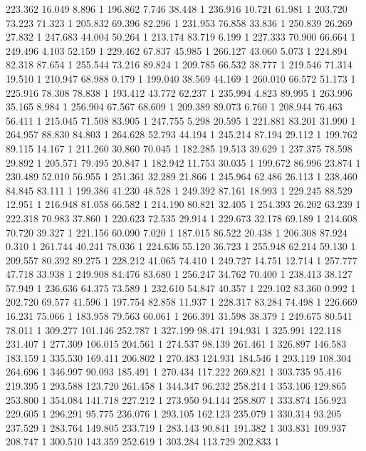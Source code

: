	223.362	16.049	8.896	1
	196.862	7.746	38.448	1
	236.916	10.721	61.981	1
	203.720	73.223	71.323	1
	205.832	69.396	82.296	1
	231.953	76.858	33.836	1
	250.839	26.269	27.832	1
	247.683	44.004	50.264	1
	213.174	83.719	6.199	1
	227.333	70.900	66.664	1
	249.496	4.103	52.159	1
	229.462	67.837	45.985	1
	266.127	43.060	5.073	1
	224.894	82.318	87.654	1
	255.544	73.216	89.824	1
	209.785	66.532	38.777	1
	219.546	71.314	19.510	1
	210.947	68.988	0.179	1
	199.040	38.569	44.169	1
	260.010	66.572	51.173	1
	225.916	78.308	78.838	1
	193.412	43.772	62.237	1
	235.994	4.823	89.995	1
	263.996	35.165	8.984	1
	256.904	67.567	68.609	1
	209.389	89.073	6.760	1
	208.944	76.463	56.411	1
	215.045	71.508	83.905	1
	247.755	5.298	20.595	1
	221.881	83.201	31.990	1
	264.957	88.830	84.803	1
	264.628	52.793	44.194	1
	245.214	87.194	29.112	1
	199.762	89.115	14.167	1
	211.260	30.860	70.045	1
	182.285	19.513	39.629	1
	237.375	78.598	29.892	1
	205.571	79.495	20.847	1
	182.942	11.753	30.035	1
	199.672	86.996	23.874	1
	230.489	52.010	56.955	1
	251.361	32.289	21.866	1
	245.964	62.486	26.113	1
	238.460	84.845	83.111	1
	199.386	41.230	48.528	1
	249.392	87.161	18.993	1
	229.245	88.529	12.951	1
	216.948	81.058	66.582	1
	214.190	80.821	32.405	1
	254.393	26.202	63.239	1
	222.318	70.983	37.860	1
	220.623	72.535	29.914	1
	229.673	32.178	69.189	1
	214.608	70.720	39.327	1
	221.156	60.090	7.020	1
	187.015	86.522	20.438	1
	206.308	87.924	0.310	1
	261.744	40.241	78.036	1
	224.636	55.120	36.723	1
	255.948	62.214	59.130	1
	209.557	80.392	89.275	1
	228.212	41.065	74.410	1
	249.727	14.751	12.714	1
	257.777	47.718	33.938	1
	249.908	84.476	83.680	1
	256.247	34.762	70.400	1
	238.413	38.127	57.949	1
	236.636	64.375	73.589	1
	232.610	54.847	40.357	1
	229.102	83.360	0.992	1
	202.720	69.577	41.596	1
	197.754	82.858	11.937	1
	228.317	83.284	74.498	1
	226.669	16.231	75.066	1
	183.958	79.563	60.061	1
	266.391	31.598	38.379	1
	249.675	80.541	78.011	1
	309.277	101.146	252.787	1
	327.199	98.471	194.931	1
	325.991	122.118	231.407	1
	277.309	106.015	204.561	1
	274.537	98.139	261.461	1
	326.897	146.583	183.159	1
	335.530	169.411	206.802	1
	270.483	124.931	184.546	1
	293.119	108.304	264.696	1
	346.997	90.093	185.491	1
	270.434	117.222	269.821	1
	303.735	95.416	219.395	1
	293.588	123.720	261.458	1
	344.347	96.232	258.214	1
	353.106	129.865	253.800	1
	354.084	141.718	227.212	1
	273.950	94.144	258.807	1
	333.874	156.923	229.605	1
	296.291	95.775	236.076	1
	293.105	162.123	235.079	1
	330.314	93.205	237.529	1
	283.764	149.805	233.719	1
	283.143	90.841	191.382	1
	303.831	109.937	208.747	1
	300.510	143.359	252.619	1
	303.284	113.729	202.833	1
